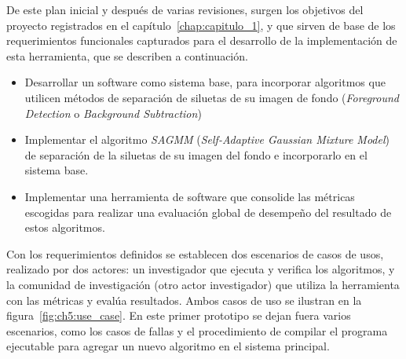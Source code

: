 
De este plan inicial y después de varias revisiones, surgen los objetivos del proyecto registrados en el capítulo~\ref{chap:capitulo_1}, y que sirven de base de los requerimientos funcionales capturados para el desarrollo de la implementación de esta herramienta, que se describen a continuación.

\begin{itemize}
\item Desarrollar un software como sistema base, para incorporar algoritmos que utilicen métodos de separación de siluetas de su imagen de fondo (\textit{Foreground Detection} o \textit{Background Subtraction})
\item Implementar el algoritmo \textit{SAGMM}\cite{chen_vehicle_2012} (\textit{Self-Adaptive Gaussian Mixture Model}) de separación de la siluetas de su imagen del fondo e incorporarlo en el sistema base. 
\item Implementar una herramienta de software que consolide las métricas escogidas para realizar una evaluación global de desempeño del resultado de estos algoritmos.
\end{itemize}

Con los requerimientos definidos se establecen dos escenarios de casos de usos, realizado por dos actores: un investigador que ejecuta y verifica los algoritmos, y la comunidad de investigación (otro actor  investigador) que utiliza la herramienta con las métricas y evalúa resultados. Ambos casos de uso se ilustran en la figura~\ref{fig:ch5:use_case}. En este primer prototipo se dejan fuera varios escenarios, como los casos de fallas y el procedimiento de compilar el programa ejecutable para agregar un nuevo algoritmo en el sistema principal.


